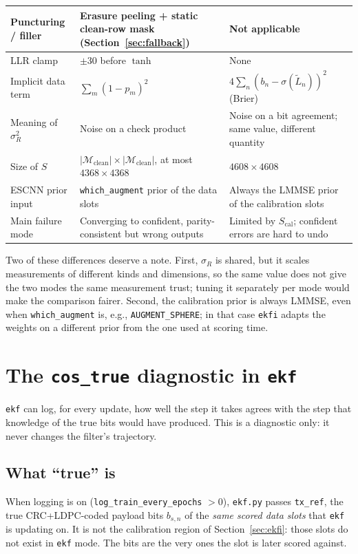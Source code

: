 \documentclass{article}
\begin{document}
{\begin{tabularx}{\textwidth}{|>{\raggedright\arraybackslash}p{3.2cm}
  |>{\raggedright\arraybackslash}X|>{\raggedright\arraybackslash}X|}
\hline
Puncturing / filler & Erasure peeling + static clean-row mask (Section~\ref{sec:fallback}) & Not applicable \\
\hline
LLR clamp & $\pm 30$ before $\tanh$ & None \\
\hline
Implicit data term & $\sum_m (1-p_m)^2$ & $4\sum_n (b_n-\sigma(\widetilde{L}_n))^2$ (Brier) \\
\hline
Meaning of $\sigma_R^2$ & Noise on a check product & Noise on a bit agreement; same value, different quantity \\
\hline
Size of $S$ & $|\mathcal{M}_{\text{clean}}|\times|\mathcal{M}_{\text{clean}}|$, at most $4368\times4368$ & $4608\times4608$ \\
\hline
ESCNN prior input & \texttt{which\_augment} prior of the data slots & Always the LMMSE prior of the calibration slots \\
\hline
Main failure mode & Converging to confident, parity-consistent but wrong outputs & Limited by $S_{\text{cal}}$; confident errors are hard to undo \\
\hline
\end{tabularx}
}

Two of these differences deserve a note. First, $\sigma_R$ is shared, but it scales measurements
of different kinds and dimensions, so the same value does not give the two modes the same
measurement trust; tuning it separately per mode would make the comparison fairer. Second, the
calibration prior is always LMMSE, even when \texttt{which\_augment} is, e.g.,
\texttt{AUGMENT\_SPHERE}; in that case \texttt{ekfi} adapts the weights on a different prior from
the one used at scoring time.

\section{The \texttt{cos\_true} diagnostic in \texttt{ekf}}
\label{sec:costrue}

\texttt{ekf} can log, for every update, how well the step it takes agrees with the step that
knowledge of the true bits would have produced. This is a diagnostic only: it never changes the
filter's trajectory.

\subsection{What ``true'' is}

When logging is on (\texttt{log\_train\_every\_epochs} $>0$), \texttt{ekf.py} passes
\texttt{tx\_ref}, the true CRC+LDPC-coded payload bits $b_{s,n}$ of the \emph{same scored data
slots} that \texttt{ekf} is updating on. It is not the calibration region of
Section~\ref{sec:ekfi}: those slots do not exist in \texttt{ekf} mode. The bits are the very ones
the slot is later scored against.
\end{document}
